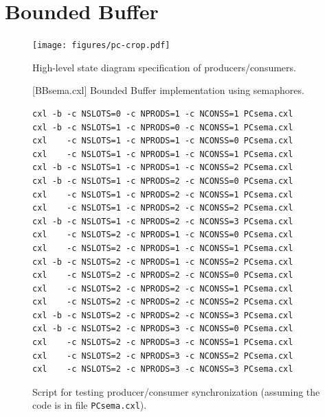 \documentclass{report}
\newenvironment{code}{
\tcolorbox
}{
\endtcolorbox
}
\begin{document}
\chapter{Bounded Buffer}
\label{ch:bb}

\begin{figure}
\begin{center}
\texttt{[image: figures/pc-crop.pdf]}
\end{center}
\caption{High-level state diagram specification of producers/consumers.}
\label{fig:pc}
\end{figure}

\begin{figure}
\begin{code}
\end{code}
\caption{[BBsema.cxl] Bounded Buffer implementation using semaphores.}
\label{fig:boundedbuffer}
\end{figure}

\begin{figure}
\begin{code}
\begin{verbatim}
cxl -b -c NSLOTS=0 -c NPRODS=1 -c NCONSS=1 PCsema.cxl
cxl -b -c NSLOTS=1 -c NPRODS=0 -c NCONSS=1 PCsema.cxl
cxl    -c NSLOTS=1 -c NPRODS=1 -c NCONSS=0 PCsema.cxl
cxl    -c NSLOTS=1 -c NPRODS=1 -c NCONSS=1 PCsema.cxl
cxl -b -c NSLOTS=1 -c NPRODS=1 -c NCONSS=2 PCsema.cxl
cxl -b -c NSLOTS=1 -c NPRODS=2 -c NCONSS=0 PCsema.cxl
cxl    -c NSLOTS=1 -c NPRODS=2 -c NCONSS=1 PCsema.cxl
cxl    -c NSLOTS=1 -c NPRODS=2 -c NCONSS=2 PCsema.cxl
cxl -b -c NSLOTS=1 -c NPRODS=2 -c NCONSS=3 PCsema.cxl
cxl    -c NSLOTS=2 -c NPRODS=1 -c NCONSS=0 PCsema.cxl
cxl    -c NSLOTS=2 -c NPRODS=1 -c NCONSS=1 PCsema.cxl
cxl -b -c NSLOTS=2 -c NPRODS=1 -c NCONSS=2 PCsema.cxl
cxl    -c NSLOTS=2 -c NPRODS=2 -c NCONSS=0 PCsema.cxl
cxl    -c NSLOTS=2 -c NPRODS=2 -c NCONSS=1 PCsema.cxl
cxl    -c NSLOTS=2 -c NPRODS=2 -c NCONSS=2 PCsema.cxl
cxl -b -c NSLOTS=2 -c NPRODS=2 -c NCONSS=3 PCsema.cxl
cxl -b -c NSLOTS=2 -c NPRODS=3 -c NCONSS=0 PCsema.cxl
cxl    -c NSLOTS=2 -c NPRODS=3 -c NCONSS=1 PCsema.cxl
cxl    -c NSLOTS=2 -c NPRODS=3 -c NCONSS=2 PCsema.cxl
cxl    -c NSLOTS=2 -c NPRODS=3 -c NCONSS=3 PCsema.cxl
\end{verbatim}
\end{code}
\caption{Script for testing producer/consumer synchronization
(assuming the code is in file \texttt{PCsema.cxl}).}
\label{fig:pcscript}
\end{figure}
\end{document}
